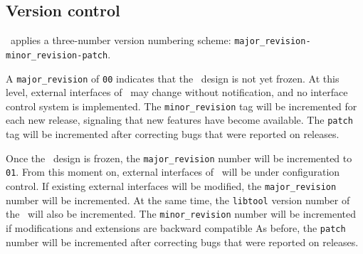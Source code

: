 \documentclass{article}[12pt,a4]
\begin{document}
\subsection{Version control}

\this\ applies a three-number version numbering scheme:
{\tt major\_revision-minor\_revision-patch}.

A {\tt major\_revision} of {\tt 00} indicates that the \this\ design is not yet frozen.
At this level, external interfaces of \this\ may change without notification, and no
interface control system is implemented.
The {\tt minor\_revision} tag will be incremented for each new release, signaling
that new features have become available.
The {\tt patch} tag will be incremented after correcting bugs that were reported
on releases.

Once the \this\ design is frozen, the {\tt major\_revision} number will be incremented 
to {\tt 01}.
From this moment on, external interfaces of \this\ will be under configuration control.
If existing external interfaces will be modified, the {\tt major\_revision} number will be
incremented.
At the same time, the {\tt libtool} version number of the \this\ will also be incremented.
The {\tt minor\_revision} number will be incremented if modifications and extensions
are backward compatible
As before, the {\tt patch} number will be incremented after correcting bugs that were 
reported on releases.
\end{document}
